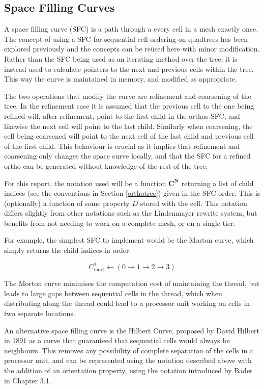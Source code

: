 \documentclass[12pt]{article}
\newcommand{\vect}[1]{\bm{#1}}
\begin{document}
\subsection{Space Filling Curves}
A space filling curve (SFC) is a path through a every cell in a mesh exactly once. The concept of using a SFC for sequential cell ordering on quadtrees has been explored previously \cite{bader2013} and the concepts can be re\"used here with minor modification. Rather than the SFC being used as an iterating method over the tree, it is instead used to calculate pointers to the next and previous cells within the tree. This way the curve is maintained in memory, and modified as appropriate. 

The two operations that modify the curve are refinement and coarsening of the tree. In the refinement case it is assumed that the previous cell to the one being refined will, after refinement, point to the first child in the orthos SFC, and likewise the next cell will point to the last child. Similarly when coarsening, the cell being coarsened will point to the next cell of the last child and previous cell of the first child. This behaviour is crucial as it implies that refinement and coarsening only changes the space curve locally, and that the SFC for a refined ortho can be generated without knowledge of the rest of the tree.

For this report, the notation used will be a function $\vect{C^N}$ returning a list of child indices (see the conventions in Section \ref{orthotree}) given in the SFC order. This is (optionally) a function of some property $D$ stored with the cell. This notation differs slightly from other notations such as the Lindenmayer rewrite system, but benefits from not needing to work on a complete mesh, or on a single tier. 

For example, the simplest SFC to implement would be the Morton curve, which simply returns the child indices in order:

\begin{equation}
	C_{\mathrm{mort}}^2 \gets \left( 0 \to 1 \to 2 \to 3 \right)
\end{equation}

The Morton curve minimises the computation cost of maintaining the thread, but leads to large gaps between sequential cells in the thread, which when distributing along the thread could lead to a processor unit working on cells in two separate locations.

An alternative space filling curve is the Hilbert Curve, proposed by David Hilbert in 1891 as a curve that guaranteed that sequential cells would always be neighbours. This removes any possibility of complete separation of the cells in a processor unit, and can be represented using the notation described above with the addition of an orientation property, using the notation introduced by Bader \cite{bader2013} in Chapter 3.1. 
\end{document}

